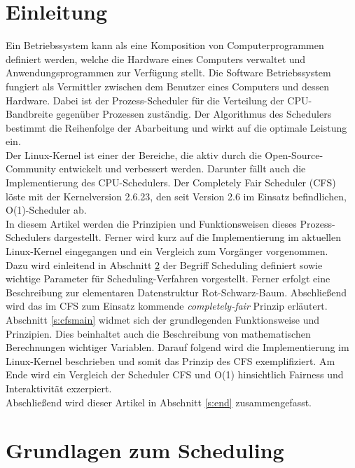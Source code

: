 \documentclass[ngerman]{seminarvorlage}
\begin{document}
\section{Einleitung}
Ein Betriebssystem kann als eine Komposition von Computerprogrammen definiert werden, welche die Hardware eines Computers verwaltet und Anwendungsprogrammen zur Verfügung stellt. Die Software Betriebssystem fungiert als Vermittler zwischen dem Benutzer eines Computers und dessen Hardware. Dabei ist der Prozess-Scheduler  für die Verteilung der CPU-Bandbreite gegenüber Prozessen zuständig. Der Algorithmus des Schedulers bestimmt die Reihenfolge der Abarbeitung und wirkt auf die optimale Leistung ein.\\
Der Linux-Kernel ist einer der Bereiche, die aktiv durch die Open-Source-Community entwickelt und verbessert werden. Darunter fällt auch die Implementierung des CPU-Schedulers. Der Completely Fair Scheduler (CFS) löste mit der Kernelversion 2.6.23, den seit Version 2.6 im Einsatz befindlichen, O(1)-Scheduler ab.\\
In diesem Artikel werden die Prinzipien und Funktionsweisen dieses Prozess-Schedulers dargestellt. Ferner wird kurz auf die Implementierung im aktuellen Linux-Kernel eingegangen und ein Vergleich zum Vorgänger vorgenommen.\\
Dazu wird einleitend in Abschnitt \ref{s:basics} der Begriff Scheduling definiert sowie wichtige Parameter für Scheduling-Verfahren vorgestellt. Ferner erfolgt eine Beschreibung zur elementaren Datenstruktur Rot-Schwarz-Baum. Abschließend wird das im CFS zum Einsatz kommende \textit{com\-ple\-te\-ly-fair} Prinzip erläutert.\\
Abschnitt \ref{s:cfsmain} widmet sich der grundlegenden Funktionsweise und Prinzipien. Dies beinhaltet auch die Beschreibung von mathematischen Berechnungen wichtiger Variablen. Darauf folgend wird die Implementierung im Linux-Kernel beschrieben und somit das Prinzip des CFS exemplifiziert. Am Ende wird ein Vergleich der Scheduler CFS und O(1) hinsichtlich Fairness und Interaktivität exzerpiert. \\
Abschließend wird dieser Artikel in Abschnitt \ref{s:end} zusammengefasst.

\section{Grundlagen zum Scheduling}\label{s:basics}
\end{document}
